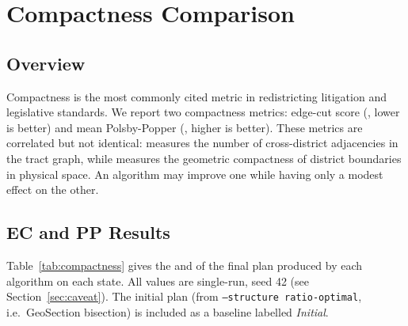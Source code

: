\section{Compactness Comparison}
\label{sec:compactness}

\subsection{Overview}

Compactness is the most commonly cited metric in redistricting litigation
and legislative standards.
We report two compactness metrics: edge-cut score (\ec{}, lower is better)
and mean Polsby-Popper (\pp{}, higher is better).
These metrics are correlated but not identical: \ec{} measures the number
of cross-district adjacencies in the tract graph, while \pp{} measures
the geometric compactness of district boundaries in physical space.
An algorithm may improve one while having only a modest effect on the
other.

\subsection{EC and PP Results}

Table~\ref{tab:compactness} gives the \ec{} and \pp{} of the final plan
produced by each algorithm on each state.
All values are single-run, seed 42 (see Section~\ref{sec:caveat}).
The initial plan (from \texttt{--structure ratio-optimal}, i.e.\ GeoSection
bisection) is included as a baseline labelled \emph{Initial}.

